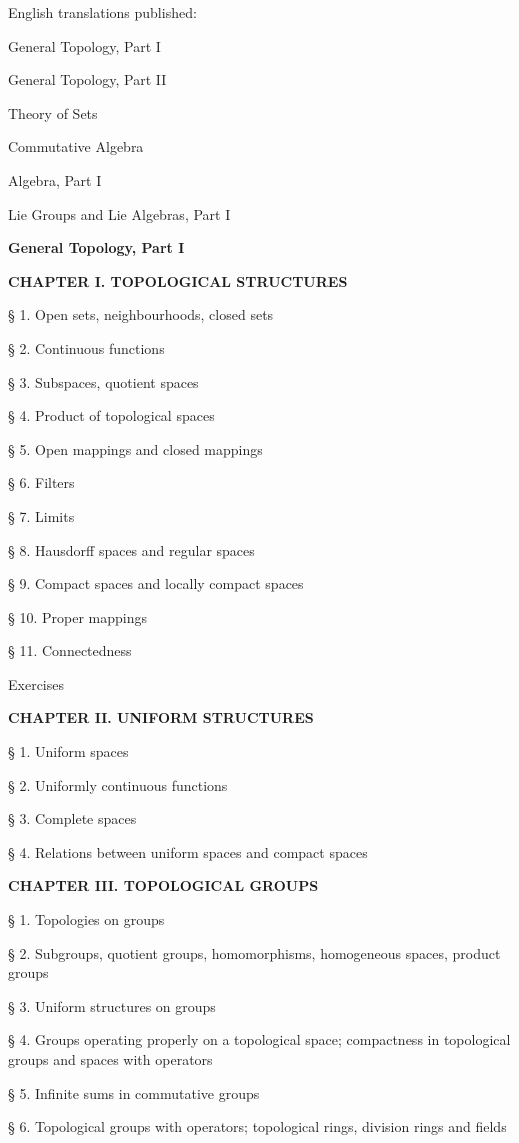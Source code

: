 
English translations published:

General Topology, Part I

General Topology, Part II

Theory of Sets

Commutative Algebra

Algebra, Part I

Lie Groups and Lie Algebras, Part I

\textbf{General Topology, Part I}

\textbf{CHAPTER I. TOPOLOGICAL STRUCTURES}

§ 1. Open sets, neighbourhoods, closed sets

§ 2. Continuous functions

§ 3. Subspaces, quotient spaces

§ 4. Product of topological spaces

§ 5. Open mappings and closed mappings

§ 6. Filters

§ 7. Limits

§ 8. Hausdorff spaces and regular spaces

§ 9. Compact spaces and locally compact spaces

§ 10. Proper mappings

§ 11. Connectedness

Exercises

\textbf{CHAPTER II. UNIFORM STRUCTURES}

§ 1. Uniform spaces

§ 2. Uniformly continuous functions

§ 3. Complete spaces

§ 4. Relations between uniform spaces and compact spaces

\textbf{CHAPTER III. TOPOLOGICAL GROUPS}

§ 1. Topologies on groups

§ 2. Subgroups, quotient groups, homomorphisms, homogeneous spaces, product groups

§ 3. Uniform structures on groups

§ 4. Groups operating properly on a topological space; compactness in topological groups and spaces with operators

§ 5. Infinite sums in commutative groups

§ 6. Topological groups with operators; topological rings, division rings and fields

